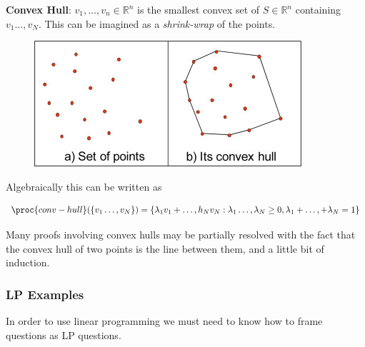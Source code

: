 \documentclass[../notes.tex]{subfiles}
\begin{document}
\begin{definition}
    \textbf{Convex Hull}: $ v_1, \ldots, v_n \in \mathbb{R}^n $ is the smallest convex set of $ S \in \mathbb{R}^n  $ containing $ v_1 \ldots, v_N $.
    This can be imagined as a \textit{shrink-wrap} of the points.
    \begin{figure}[H]
        \centering
        \includegraphics[width=0.8\linewidth]{img/image_2023-03-08-12-25-32.png}
    \end{figure}

    Algebraically this can be written as

    \begin{equation}
        \proc{conv-hull}(\left\{ v_1 \ldots, v_N\right\} ) =
        \left\{ \lambda_1 v_1 + \ldots, h_N v_N : \lambda_1 \ldots, \lambda_N \ge 0, \lambda_1 + \ldots, + \lambda_N = 1 \right\} 
    \end{equation}

    Many proofs involving convex hulls may be partially resolved with the fact that the convex hull of two points is the line between them, and a little bit of induction.
\end{definition}

\subsubsection{LP Examples}

\begin{blockquote}
    In order to use linear programming we must need to know how to frame questions as LP questions.
\end{blockquote}
\end{document}
